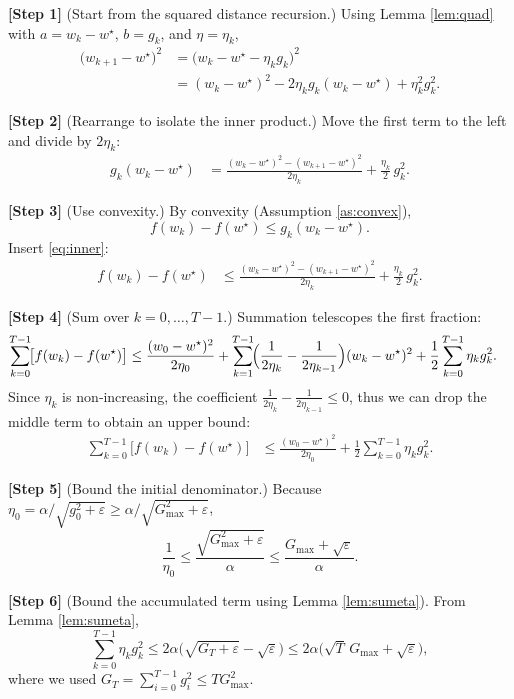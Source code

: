 \documentclass{article}
\begin{document}
\bigskip
\noindent\textbf{[Step 1]} (Start from the squared distance recursion.)  
Using Lemma \ref{lem:quad} with $a=w_k-w^{\star}$, $b=g_k$, and
$\eta=\eta_k$,
\begin{align}
\bigl(w_{k+1}-w^{\star}\bigr)^{2}
&= \bigl(w_k-w^{\star}-\eta_k g_k\bigr)^{2}\nonumber\\
&= (w_k-w^{\star})^{2}
-2\eta_k g_k (w_k-w^{\star})
+\eta_k^{2} g_k^{2}. \label{eq:dist}
\end{align}

\noindent\textbf{[Step 2]} (Rearrange to isolate the inner product.)  
Move the first term to the left and divide by $2\eta_k$:
\begin{align}
g_k (w_k-w^{\star})
&= \frac{(w_k-w^{\star})^{2}-(w_{k+1}-w^{\star})^{2}}{2\eta_k}
+\frac{\eta_k}{2}\, g_k^{2}. \label{eq:inner}
\end{align}

\noindent\textbf{[Step 3]} (Use convexity.)  
By convexity (Assumption \ref{as:convex}),
\[
f(w_k)-f(w^{\star})\le g_k (w_k-w^{\star}).
\]
Insert \eqref{eq:inner}:
\begin{align}
f(w_k)-f(w^{\star})
&\le
\frac{(w_k-w^{\star})^{2}-(w_{k+1}-w^{\star})^{2}}{2\eta_k}
+\frac{\eta_k}{2}\, g_k^{2}. \label{eq:conv}
\end{align}

\noindent\textbf{[Step 4]} (Sum over $k=0,\dots,T-1$.)  
Summation telescopes the first fraction:
\begin{align}
\sum_{k=0}^{T-1}\!\bigl[f(w_k)-f(w^{\star})\bigr]
&\le
\frac{(w_0-w^{\star})^{2}}{2\eta_0}
+\sum_{k=1}^{T-1}\!\Bigl(\frac{1}{2\eta_k}-\frac{1}{2\eta_{k-1}}\Bigr)(w_k-w^{\star})^{2}
+\frac12\sum_{k=0}^{T-1}\eta_k g_k^{2}. \label{eq:sum}
\end{align}
Since $\eta_k$ is non‑increasing, the coefficient
$\frac{1}{2\eta_k}-\frac{1}{2\eta_{k-1}}\le 0$, thus we can drop the middle term
to obtain an upper bound:
\begin{align}
\sum_{k=0}^{T-1}\!\bigl[f(w_k)-f(w^{\star})\bigr]
&\le
\frac{(w_0-w^{\star})^{2}}{2\eta_0}
+\frac12\sum_{k=0}^{T-1}\eta_k g_k^{2}. \label{eq:bound1}
\end{align}

\noindent\textbf{[Step 5]} (Bound the initial denominator.)  
Because $\eta_0=\alpha/\sqrt{g_0^{2}+\varepsilon}\ge \alpha/\sqrt{G_{\max}^{2}+\varepsilon}$,
\[
\frac{1}{\eta_0}\le \frac{\sqrt{G_{\max}^{2}+\varepsilon}}{\alpha}
\le \frac{G_{\max}+\sqrt{\varepsilon}}{\alpha}.
\]

\noindent\textbf{[Step 6]} (Bound the accumulated term using Lemma \ref{lem:sumeta}).  
From Lemma \ref{lem:sumeta},
\[
\sum_{k=0}^{T-1}\eta_k g_k^{2}
\le
2\alpha\bigl(\sqrt{G_T+\varepsilon}-\sqrt{\varepsilon}\bigr)
\le
2\alpha\bigl(\sqrt{T}\,G_{\max}+\sqrt{\varepsilon}\bigr),
\]
where we used $G_T=\sum_{i=0}^{T-1}g_i^{2}\le T G_{\max}^{2}$.
\end{document}
